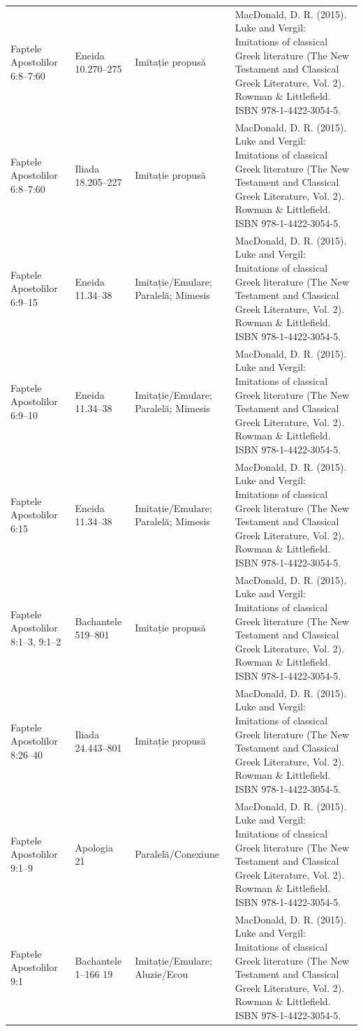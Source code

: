 \documentclass[12pt,a4paper,twoside,openany]{book}
\begin{document}
\begin{longtable}{L{1.4cm}L{1.7cm}L{3.1cm}L{8.4cm}}
Faptele Apostolilor 6:8–7:60 & Eneida 10.270–275 & Imitație propusă & MacDonald, D. R. (2015). Luke and Vergil: Imitations of classical Greek literature (The New Testament and Classical Greek Literature, Vol. 2). Rowman \& Littlefield. ISBN 978-1-4422-3054-5. \\
Faptele Apostolilor 6:8–7:60 & Iliada 18.205–227 & Imitație propusă & MacDonald, D. R. (2015). Luke and Vergil: Imitations of classical Greek literature (The New Testament and Classical Greek Literature, Vol. 2). Rowman \& Littlefield. ISBN 978-1-4422-3054-5. \\
Faptele Apostolilor 6:9–15 & Eneida 11.34–38 & Imitație/Emulare; Paralelă; Mimesis & MacDonald, D. R. (2015). Luke and Vergil: Imitations of classical Greek literature (The New Testament and Classical Greek Literature, Vol. 2). Rowman \& Littlefield. ISBN 978-1-4422-3054-5. \\
Faptele Apostolilor 6:9–10 & Eneida 11.34–38 & Imitație/Emulare; Paralelă; Mimesis & MacDonald, D. R. (2015). Luke and Vergil: Imitations of classical Greek literature (The New Testament and Classical Greek Literature, Vol. 2). Rowman \& Littlefield. ISBN 978-1-4422-3054-5. \\
Faptele Apostolilor 6:15 & Eneida 11.34–38 & Imitație/Emulare; Paralelă; Mimesis & MacDonald, D. R. (2015). Luke and Vergil: Imitations of classical Greek literature (The New Testament and Classical Greek Literature, Vol. 2). Rowman \& Littlefield. ISBN 978-1-4422-3054-5. \\
Faptele Apostolilor 8:1–3, 9:1–2 & Bachantele 519–801 & Imitație propusă & MacDonald, D. R. (2015). Luke and Vergil: Imitations of classical Greek literature (The New Testament and Classical Greek Literature, Vol. 2). Rowman \& Littlefield. ISBN 978-1-4422-3054-5. \\
Faptele Apostolilor 8:26–40 & Iliada 24.443–801 & Imitație propusă & MacDonald, D. R. (2015). Luke and Vergil: Imitations of classical Greek literature (The New Testament and Classical Greek Literature, Vol. 2). Rowman \& Littlefield. ISBN 978-1-4422-3054-5. \\
Faptele Apostolilor 9:1–9 & Apologia 21 & Paralelă/Conexiune & MacDonald, D. R. (2015). Luke and Vergil: Imitations of classical Greek literature (The New Testament and Classical Greek Literature, Vol. 2). Rowman \& Littlefield. ISBN 978-1-4422-3054-5. \\
Faptele Apostolilor 9:1 & Bachantele 1–166 19 & Imitație/Emulare; Aluzie/Ecou & MacDonald, D. R. (2015). Luke and Vergil: Imitations of classical Greek literature (The New Testament and Classical Greek Literature, Vol. 2). Rowman \& Littlefield. ISBN 978-1-4422-3054-5. \\

\end{longtable}
\end{document}
